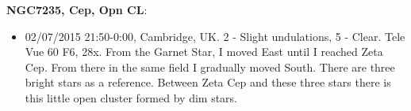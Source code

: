 {\bf NGC7235, Cep, Opn CL}:
\begin{itemize}
\item 02/07/2015 21:50-0:00, Cambridge, UK. 2 - Slight undulations, 5 - Clear. Tele Vue 60 F6, 28x. From the Garnet Star, I moved East until I reached Zeta Cep. From there in the same field I gradually moved South. There are three bright stars as a reference. Between Zeta Cep and these three stars there is this little open cluster formed by dim stars. 
\end{itemize}
